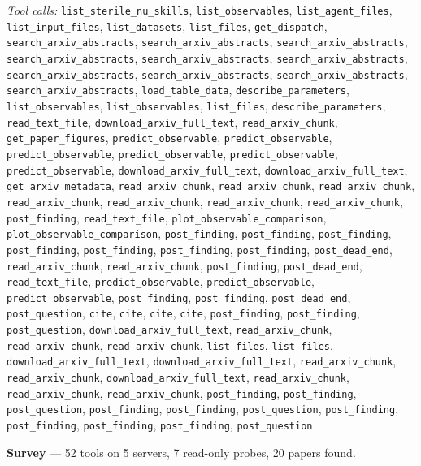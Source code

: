 \documentclass[11pt,a4paper]{article}
\begin{document}
\textit{Tool calls:} \texttt{list\_sterile\_nu\_skills}, \texttt{list\_observables}, \texttt{list\_agent\_files}, \texttt{list\_input\_files}, \texttt{list\_datasets}, \texttt{list\_files}, \texttt{get\_dispatch}, \texttt{search\_arxiv\_abstracts}, \texttt{search\_arxiv\_abstracts}, \texttt{search\_arxiv\_abstracts}, \texttt{search\_arxiv\_abstracts}, \texttt{search\_arxiv\_abstracts}, \texttt{search\_arxiv\_abstracts}, \texttt{search\_arxiv\_abstracts}, \texttt{search\_arxiv\_abstracts}, \texttt{search\_arxiv\_abstracts}, \texttt{search\_arxiv\_abstracts}, \texttt{load\_table\_data}, \texttt{describe\_parameters}, \texttt{list\_observables}, \texttt{list\_observables}, \texttt{list\_files}, \texttt{describe\_parameters}, \texttt{read\_text\_file}, \texttt{download\_arxiv\_full\_text}, \texttt{read\_arxiv\_chunk}, \texttt{get\_paper\_figures}, \texttt{predict\_observable}, \texttt{predict\_observable}, \texttt{predict\_observable}, \texttt{predict\_observable}, \texttt{predict\_observable}, \texttt{predict\_observable}, \texttt{download\_arxiv\_full\_text}, \texttt{download\_arxiv\_full\_text}, \texttt{get\_arxiv\_metadata}, \texttt{read\_arxiv\_chunk}, \texttt{read\_arxiv\_chunk}, \texttt{read\_arxiv\_chunk}, \texttt{read\_arxiv\_chunk}, \texttt{read\_arxiv\_chunk}, \texttt{read\_arxiv\_chunk}, \texttt{read\_arxiv\_chunk}, \texttt{post\_finding}, \texttt{read\_text\_file}, \texttt{plot\_observable\_comparison}, \texttt{plot\_observable\_comparison}, \texttt{post\_finding}, \texttt{post\_finding}, \texttt{post\_finding}, \texttt{post\_finding}, \texttt{post\_finding}, \texttt{post\_finding}, \texttt{post\_finding}, \texttt{post\_dead\_end}, \texttt{read\_arxiv\_chunk}, \texttt{read\_arxiv\_chunk}, \texttt{post\_finding}, \texttt{post\_dead\_end}, \texttt{read\_text\_file}, \texttt{predict\_observable}, \texttt{predict\_observable}, \texttt{predict\_observable}, \texttt{post\_finding}, \texttt{post\_finding}, \texttt{post\_dead\_end}, \texttt{post\_question}, \texttt{cite}, \texttt{cite}, \texttt{cite}, \texttt{cite}, \texttt{post\_finding}, \texttt{post\_finding}, \texttt{post\_question}, \texttt{download\_arxiv\_full\_text}, \texttt{read\_arxiv\_chunk}, \texttt{read\_arxiv\_chunk}, \texttt{read\_arxiv\_chunk}, \texttt{list\_files}, \texttt{list\_files}, \texttt{download\_arxiv\_full\_text}, \texttt{download\_arxiv\_full\_text}, \texttt{read\_arxiv\_chunk}, \texttt{read\_arxiv\_chunk}, \texttt{download\_arxiv\_full\_text}, \texttt{read\_arxiv\_chunk}, \texttt{read\_arxiv\_chunk}, \texttt{read\_arxiv\_chunk}, \texttt{post\_finding}, \texttt{post\_finding}, \texttt{post\_question}, \texttt{post\_finding}, \texttt{post\_finding}, \texttt{post\_question}, \texttt{post\_finding}, \texttt{post\_finding}, \texttt{post\_finding}, \texttt{post\_finding}, \texttt{post\_question}\par
\textbf{Survey} --- 52 tools on 5 servers, 7 read-only probes, 20 papers found.
\end{document}
